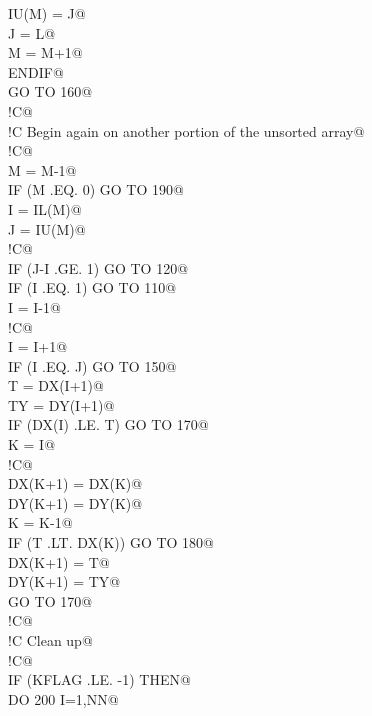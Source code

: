 \documentclass[10pt,a4paper,notitlepage]{article}
\begin{document}
\begin{flushleft}
\begin{list}{}{}
\mbox{}\verb@         IU(M) = J@\\
\mbox{}\verb@         J = L@\\
\mbox{}\verb@         M = M+1@\\
\mbox{}\verb@      ENDIF@\\
\mbox{}\verb@      GO TO 160@\\
\mbox{}\verb@!C@\\
\mbox{}\verb@!C     Begin again on another portion of the unsorted array@\\
\mbox{}\verb@!C@\\
\mbox{} M = M-1@\\
\mbox{}\verb@      IF (M .EQ. 0) GO TO 190@\\
\mbox{}\verb@      I = IL(M)@\\
\mbox{}\verb@      J = IU(M)@\\
\mbox{}\verb@!C@\\
\mbox{} IF (J-I .GE. 1) GO TO 120@\\
\mbox{}\verb@      IF (I .EQ. 1) GO TO 110@\\
\mbox{}\verb@      I = I-1@\\
\mbox{}\verb@!C@\\
\mbox{} I = I+1@\\
\mbox{}\verb@      IF (I .EQ. J) GO TO 150@\\
\mbox{}\verb@      T = DX(I+1)@\\
\mbox{}\verb@      TY = DY(I+1)@\\
\mbox{}\verb@      IF (DX(I) .LE. T) GO TO 170@\\
\mbox{}\verb@      K = I@\\
\mbox{}\verb@!C@\\
\mbox{} DX(K+1) = DX(K)@\\
\mbox{}\verb@      DY(K+1) = DY(K)@\\
\mbox{}\verb@      K = K-1@\\
\mbox{}\verb@      IF (T .LT. DX(K)) GO TO 180@\\
\mbox{}\verb@      DX(K+1) = T@\\
\mbox{}\verb@      DY(K+1) = TY@\\
\mbox{}\verb@      GO TO 170@\\
\mbox{}\verb@!C@\\
\mbox{}\verb@!C     Clean up@\\
\mbox{}\verb@!C@\\
\mbox{} IF (KFLAG .LE. -1) THEN@\\
\mbox{}\verb@         DO 200 I=1,NN@\\

\end{list}
\end{flushleft}
\end{document}

